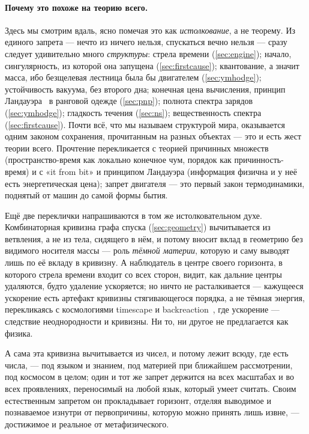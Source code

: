 \paragraph{Почему это похоже на теорию всего.}
Здесь мы смотрим вдаль, ясно помечая это как \emph{истолкование}, а не теорему. Из единого запрета —
нечто из ничего нельзя, спускаться вечно нельзя — сразу следует удивительно много \emph{структуры}:
стрела времени (\cref{sec:engine}); начало, сингулярность, из которой она запущена
(\cref{sec:firstcause}); квантование, а значит масса, ибо безщелевая лестница была бы двигателем
(\cref{sec:ymhodge}); устойчивость вакуума, без второго дна; конечная цена вычисления, принцип
Ландауэра~\cite{landauer1961} в ранговой одежде (\cref{sec:pnp}); полнота спектра зарядов (\cref{sec:ymhodge}); гладкость
течения (\cref{sec:ns}); вещественность спектра (\cref{sec:firstcause}). Почти всё, что мы называем
структурой мира, оказывается одним законом сохранения, прочитанным на разных объектах — это и есть жест
теории всего. Прочтение перекликается с теорией причинных множеств (пространство-время как локально
конечное чум, порядок как причинность-время) и с «it from bit» и принципом Ландауэра (информация
физична и у неё есть энергетическая цена); запрет двигателя — это первый закон термодинамики, поднятый
от машин до самой формы бытия.

Ещё две переклички напрашиваются в том же истолковательном духе. Комбинаторная кривизна графа спуска
(\cref{sec:geometry}) вычитывается из ветвления, а не из тела, сидящего в нём, и потому вносит вклад в
геометрию без видимого носителя массы --- роль \emph{тёмной материи}, которую и саму выводят лишь по
её вкладу в кривизну. А наблюдатель в центре своего горизонта, в которого стрела времени входит со
всех сторон, видит, как дальние центры удаляются, будто удаление ускоряется; но ничто не
расталкивается --- кажущееся ускорение есть артефакт кривизны стягивающегося порядка, а не тёмная
энергия, перекликаясь с космологиями timescape и backreaction~\cite{wiltshire2007}, где ускорение ---
следствие неоднородности и кривизны. Ни то, ни другое не предлагается как физика.

А сама эта кривизна вычитывается из чисел, и потому лежит всюду, где есть числа, --- под языком и
знанием, под материей при ближайшем рассмотрении, под космосом в целом; один и тот же запрет держится
на всех масштабах и во всех проявлениях, переносимый на любой язык, который умеет считать. Своим
естественным запретом он прокладывает горизонт, отделяя выводимое и познаваемое изнутри от
первопричины, которую можно принять лишь извне, --- достижимое и реальное от метафизического.

